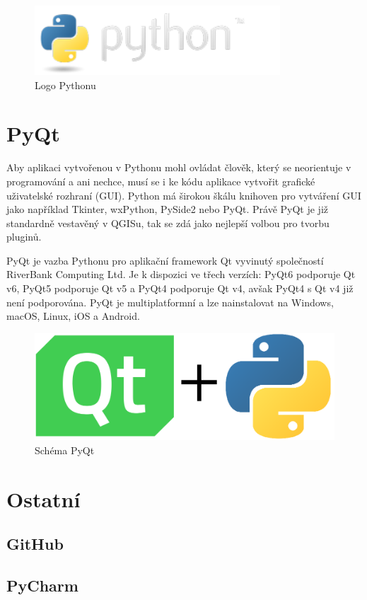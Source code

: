 \begin{figure}[H] \centering
    \includegraphics[width=260pt]{./pictures/python-logo.png}
    \caption[Logo Pythonu]{Logo Pythonu \cite{python}}
	\label{fig:python-logo}                                
\end{figure} 

\section{PyQt}
Aby aplikaci vytvořenou v Pythonu mohl ovládat člověk, který se neorientuje v programování a ani nechce,
musí se i ke kódu aplikace vytvořit grafické uživatelské rozhraní (GUI). Python má širokou škálu knihoven
pro vytváření GUI jako například Tkinter, wxPython, PySide2 nebo PyQt. Právě PyQt je již standardně 
vestavěný v QGISu, tak se zdá jako nejlepší volbou pro tvorbu pluginů.  

PyQt je vazba Pythonu pro aplikační framework Qt vyvinutý společností RiverBank Computing Ltd.
Je k dispozici ve třech verzích: PyQt6 podporuje Qt v6, PyQt5 podporuje Qt v5 a PyQt4 podporuje Qt v4,
avšak PyQt4 s Qt v4 již není podporována. PyQt je multiplatformní a lze nainstalovat na Windows,
macOS, Linux, iOS a Android. \cite{pyqt}

\begin{figure}[H] \centering
    \includegraphics[width=400pt]{./pictures/pyqt.png}
    \caption[Schéma PyQt Pythonu]{Schéma PyQt}
	\label{fig:pyqt}                                
\end{figure} 

\section{Ostatní}

\subsection{GitHub}

\subsection{PyCharm}